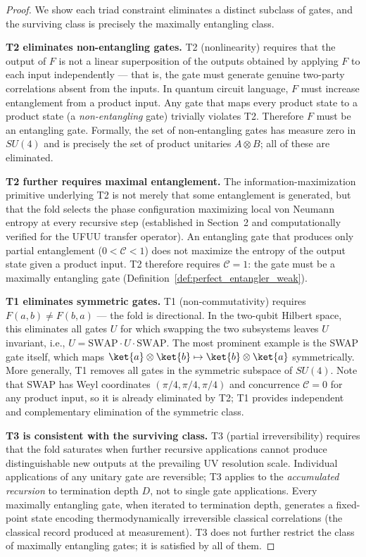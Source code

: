 \begin{proof}
We show each triad constraint eliminates a distinct subclass of gates,
and the surviving class is precisely the maximally entangling class.

\medskip
\noindent\textbf{T2 eliminates non-entangling gates.}
T2 (nonlinearity) requires that the output of $F$ is not a linear
superposition of the outputs obtained by applying $F$ to each input
independently --- that is, the gate must generate genuine two-party
correlations absent from the inputs. In quantum circuit language, $F$
must increase entanglement from a product input. Any gate that maps
every product state to a product state (a \emph{non-entangling} gate)
trivially violates T2. Therefore $F$ must be an entangling gate.
Formally, the set of non-entangling gates has measure zero in $SU(4)$
and is precisely the set of product unitaries $A\otimes B$; all of
these are eliminated.

\medskip
\noindent\textbf{T2 further requires maximal entanglement.}
The information-maximization primitive underlying T2 is not merely
that some entanglement is generated, but that the fold selects the
phase configuration maximizing local von Neumann entropy at every
recursive step (established in Section~2 and computationally
verified for the UFUU transfer operator). An entangling gate that
produces only partial entanglement ($0 < \mathcal{C} < 1$) does
not maximize the entropy of the output state given a product input.
T2 therefore requires $\mathcal{C} = 1$: the gate must be a
maximally entangling gate (Definition~\ref{def:perfect_entangler_weak}).

\medskip
\noindent\textbf{T1 eliminates symmetric gates.}
T1 (non-commutativity) requires $F(a,b) \neq F(b,a)$ --- the fold
is directional. In the two-qubit Hilbert space, this eliminates all
gates $U$ for which swapping the two subsystems leaves $U$ invariant,
i.e., $U = \mathrm{SWAP}\cdot U\cdot\mathrm{SWAP}$. The most
prominent example is the SWAP gate itself, which maps
$\ket{a}\otimes\ket{b} \mapsto \ket{b}\otimes\ket{a}$ symmetrically.
More generally, T1 removes all gates in the symmetric subspace of
$SU(4)$. Note that SWAP has Weyl coordinates $(\pi/4, \pi/4, \pi/4)$
and concurrence $\mathcal{C} = 0$ for any product input, so it is
already eliminated by T2; T1 provides independent and complementary
elimination of the symmetric class.

\medskip
\noindent\textbf{T3 is consistent with the surviving class.}
T3 (partial irreversibility) requires that the fold saturates when
further recursive applications cannot produce distinguishable new
outputs at the prevailing UV resolution scale. Individual applications
of any unitary gate are reversible; T3 applies to the \emph{accumulated
recursion} to termination depth $D$, not to single gate applications.
Every maximally entangling gate, when iterated to termination depth,
generates a fixed-point state encoding thermodynamically irreversible
classical correlations (the classical record produced at measurement).
T3 does not further restrict the class of maximally entangling gates;
it is satisfied by all of them.


\end{proof}
